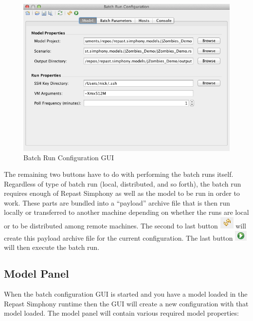 \documentclass[11pt]{amsart}
\begin{document}
\begin{figure}[h]
\begin{center}
\vspace{.2in}
\centerline {
\includegraphics[width=6in]{images/config_gui.png}
}
\caption{Batch Run Configuration GUI}
\label{fig:config_gui}
\end{center}
\end{figure}


The remaining two buttons have to do with performing the batch runs itself. Regardless of type of batch run (local, distributed, and so forth), the batch run requires enough of Repast Simphony as well as the model to be run in order to work. These parts are bundled into a ``payload'' archive file that is then run locally or transferred to another machine depending on whether the runs are local or to be distributed among remote machines. The second to last button \includegraphics[height=.2in]{images/create_archive_button.png} will create this payload archive file for the current configuration. The last button  \includegraphics[height=.2in]{images/run_button.png} will then execute the batch run.

\subsection{Model Panel}
When the batch configuration GUI is started and you have a model loaded in the Repast Simphony runtime then the GUI will create a new configuration with that model loaded. The model panel will contain various required model properties:
\end{document}
